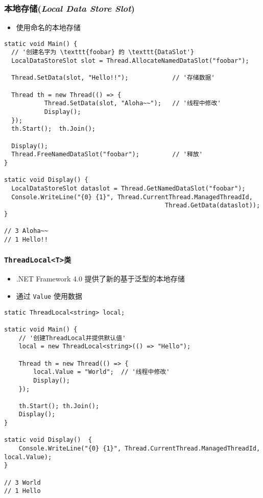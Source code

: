\begin{frame}[fragile]
\frametitle{本地存储(\textit{Local Data Store Slot})}
\begin{itemize}
\item 使用命名的本地存储
\end{itemize}
\lstset{basicstyle=\tiny\ttfamily}
\begin{lstlisting}[escapeinside='']
static void Main() {
  // '创建名字为 \texttt{foobar} 的 \texttt{DataSlot'}
  LocalDataStoreSlot slot = Thread.AllocateNamedDataSlot("foobar");

  Thread.SetData(slot, "Hello!!");            // '存储数据'

  Thread th = new Thread(() => {
           Thread.SetData(slot, "Aloha~~");   // '线程中修改'
           Display();
  });
  th.Start();  th.Join(); 

  Display();
  Thread.FreeNamedDataSlot("foobar");         // '释放'
}

static void Display() {
  LocalDataStoreSlot dataslot = Thread.GetNamedDataSlot("foobar");
  Console.WriteLine("{0} {1}", Thread.CurrentThread.ManagedThreadId,
                                            Thread.GetData(dataslot));
}

// 3 Aloha~~
// 1 Hello!!
\end{lstlisting}
\end{frame}

\begin{frame}[fragile]
\frametitle{\texttt{ThreadLocal<T>类}}
\begin{itemize}
\item .NET Framework 4.0 提供了新的基于泛型的本地存储
\item 通过 \texttt{Value} 使用数据
\end{itemize}
\lstset{basicstyle=\tiny\ttfamily}
\begin{lstlisting}[escapeinside='']
static ThreadLocal<string> local;

static void Main() {
    // '创建ThreadLocal并提供默认值'
    local = new ThreadLocal<string>(() => "Hello");
    
    Thread th = new Thread(() => {
        local.Value = "World";  // '线程中修改'
        Display();
    });

    th.Start(); th.Join();
    Display();
}

static void Display()  {
    Console.WriteLine("{0} {1}", Thread.CurrentThread.ManagedThreadId, local.Value);
}

// 3 World
// 1 Hello

\end{lstlisting}
\end{frame}



